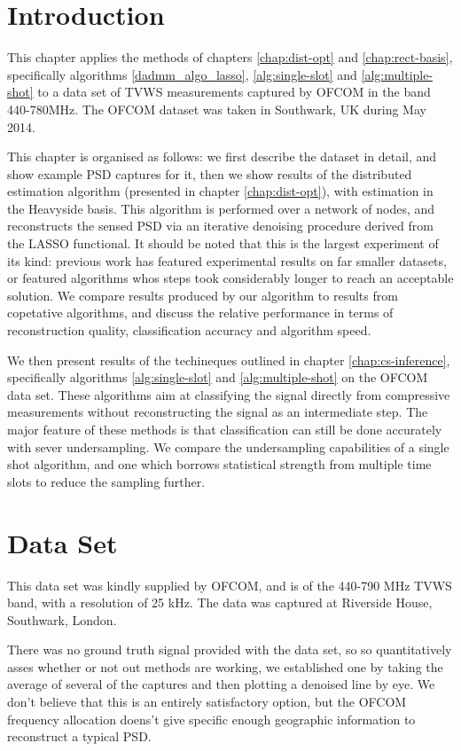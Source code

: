 \section{Introduction}

This chapter applies the methods of chapters \ref{chap:dist-opt} and \ref{chap:rect-basis}, specifically algorithms \ref{dadmm_algo_lasso}, \ref{alg:single-slot} and \ref{alg:multiple-shot} to a data set of TVWS measurements captured by OFCOM in the band 440-780MHz. The OFCOM dataset was taken in Southwark, UK during May 2014.

This chapter is organised as follows: we first describe the dataset in detail, and show example PSD captures for it, then we show results of the distributed estimation algorithm (presented in chapter \eqref{chap:dist-opt}), with estimation in the Heavyside basis. This algorithm is performed over a network of nodes, and reconstructs the sensed PSD via an iterative denoising procedure derived from the LASSO functional. It should be noted that this is the largest experiment of its kind: previous work has featured experimental results on far smaller datasets, or featured algorithms whos steps took considerably longer to reach an acceptable solution. We compare results produced by our algorithm to results from copetative algorithms, and discuss the relative performance in terms of reconstruction quality, classification accuracy and algorithm speed. 

We then present results of the techineques outlined in chapter \eqref{chap:cs-inference}, specifically algorithms \ref{alg:single-slot} and \ref{alg:multiple-shot} on the OFCOM data set. These algorithms aim at classifying the signal directly from compressive measurements without reconstructing the signal as an intermediate step. The major feature of these methods is that classification can still be done accurately with sever undersampling. We compare the undersampling capabilities of a single shot algorithm, and one which borrows statistical strength from multiple time slots to reduce the sampling further.

\section{Data Set}

This data set was kindly supplied by OFCOM, and is of the 440-790 MHz TVWS band, with a resolution of 25 kHz. The data was captured at Riverside House, Southwark, London. 

There was no ground truth signal provided with the data set, so so quantitatively asses whether or not out methods are working, we established one by taking the average of several of the captures and then plotting a denoised line by eye. We don't believe that this is an entirely satisfactory option, but the OFCOM frequency allocation doens't give specific enough geographic information to reconstruct a typical PSD. 

